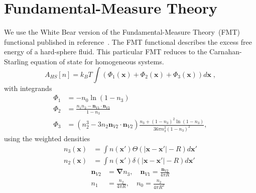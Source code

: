 \documentclass[letterpaper,twocolumn,amsmath,amssymb,jcp,10pt,aip]{revtex4-1}
\newcommand{\xx}{\textbf{x}}
\begin{document}
\section{Fundamental-Measure Theory}

We use the White Bear version of the Fundamental-Measure Theory~(FMT)
functional published in reference~\cite{roth2002whitebear}.  The FMT
functional describes the excess free energy of a hard-sphere fluid.
This particular FMT reduces to the Carnahan-Starling equation of state
for homogeneous systems.
\begin{equation}
A_\textit{HS}[n] = k_B T \int \left(\Phi_1(\xx) + \Phi_2(\xx) + \Phi_3(\xx)\right) d\xx \; ,
\end{equation}
with integrands
\begin{align}
\Phi_1 &= -n_0 \ln\left( 1 - n_3\right)\\
\Phi_2 &= \frac{n_1 n_2 - \mathbf{n}_{V1} \cdot\mathbf{n}_{V2}}{1-n_3} \\
\Phi_3 &= (n_2^3 - 3 n_2 \mathbf{n}_{V2} \cdot \mathbf{n}_{V2}) \frac{
  n_3 + (1-n_3)^2 \ln(1-n_3)
}{
  36\pi n_3^2\left( 1 - n_3 \right)^2
} ,
\end{align}
using the weighted densities
\begin{align}
  n_3(\xx) &= \int n(\xx') \Theta(\left|\xx - \xx'\right| - R) d\xx' \\
  n_2(\xx) &= \int n(\xx') \delta(\left|\xx - \xx'\right| - R) d\xx'
\end{align}
\begin{align}
  \mathbf{n}_{V2} &= \mathbf{\nabla} n_3 , \quad
  \mathbf{n}_{V1} = \frac{\mathbf{n}_{V2}}{4\pi R} \\
  n_1 &= \frac{n_2}{4\pi R} , \quad
  n_0 = \frac{n_2}{4\pi R^2}
\end{align}

\end{document}
